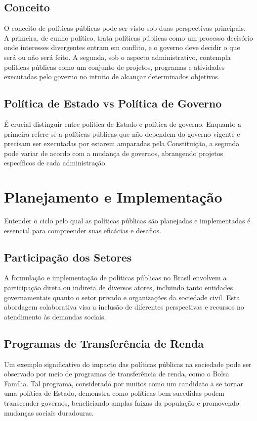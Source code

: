 \documentclass[
   article,       
   12pt,          
   oneside,       
   a4paper,       
   english,       
   brazil,        
   sumario=tradicional
   ]{abntex2}
\begin{document}
\subsection{Conceito}
O conceito de políticas públicas pode ser visto sob duas perspectivas principais. A primeira, de cunho político, trata políticas públicas como um processo decisório onde interesses divergentes entram em conflito, e o governo deve decidir o que será ou não será feito. A segunda, sob o aspecto administrativo, contempla políticas públicas como um conjunto de projetos, programas e atividades executadas pelo governo no intuito de alcançar determinados objetivos.

\subsection{Política de Estado vs Política de Governo}
É crucial distinguir entre política de Estado e política de governo. Enquanto a primeira refere-se a políticas públicas que não dependem do governo vigente e precisam ser executadas por estarem amparadas pela Constituição, a segunda pode variar de acordo com a mudança de governos, abrangendo projetos específicos de cada administração.

\section{Planejamento e Implementação}
Entender o ciclo pelo qual as políticas públicas são planejadas e implementadas é essencial para compreender suas eficácias e desafios.

\subsection{Participação dos Setores}
A formulação e implementação de políticas públicas no Brasil envolvem a participação direta ou indireta de diversos atores, incluindo tanto entidades governamentais quanto o setor privado e organizações da sociedade civil. Esta abordagem colaborativa visa a inclusão de diferentes perspectivas e recursos no atendimento às demandas sociais.

\subsection{Programas de Transferência de Renda}
Um exemplo significativo do impacto das políticas públicas na sociedade pode ser observado por meio de programas de transferência de renda, como o Bolsa Família. Tal programa, considerado por muitos como um candidato a se tornar uma política de Estado, demonstra como políticas bem-sucedidas podem transcender governos, beneficiando amplas faixas da população e promovendo mudanças sociais duradouras.
\end{document}

